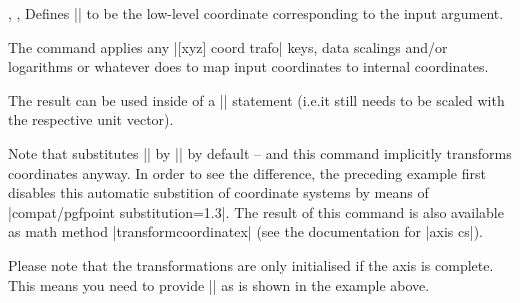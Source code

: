 \begin{commandlist}{%
    \pgfplotstransformcoordinatex{},
    \pgfplotstransformcoordinatey{},
    \pgfplotstransformcoordinatez{}%
}
    Defines |\pgfmathresult| to be the low-level \PGF{} coordinate
    corresponding to the input argument.

    The command applies any |[xyz] coord trafo| keys, data scalings and/or
    logarithms or whatever \PGFPlots{} does to map input coordinates to
    internal coordinates.

    The result can be used inside of a |\pgfpointxy| statement (i.e.\@ it still
    needs to be scaled with the respective \PGF{} unit vector).
\begin{codeexample}[]
\end{codeexample}
    Note that \PGFPlots{} substitutes |\pgfqpointxy| by |\pgfplotspointaxisxyz|
    by default -- and this command implicitly transforms coordinates anyway. In
    order to see the difference, the preceding example first disables this
    automatic substition of coordinate systems by means of
    |compat/pgfpoint substitution=1.3|.
    The result of this command is also available as math method
    |transformcoordinatex| (see the documentation for |axis cs|).

    Please note that the transformations are only initialised if the axis is
    complete. This means you need to provide |\pgfplotsextra| as is shown in
    the example above.
\end{commandlist}

